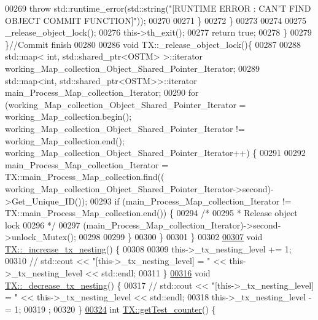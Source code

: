 \begin{DoxyCode}
00269                     \textcolor{keywordflow}{throw} std::runtime\_error(std::string(\textcolor{stringliteral}{"[RUNTIME ERROR : CAN'T FIND OBJECT COMMIT
       FUNCTION]"}));
00270 
00271                 \}
00272         \}
00273 
00274 
00275         \_release\_object\_lock();
00276         this->th\_exit();
00277         \textcolor{keywordflow}{return} \textcolor{keyword}{true};
00278     \}
00279 \}\textcolor{comment}{//Commit finish}
00280 
00286 \textcolor{keywordtype}{void} TX::\_release\_object\_lock()\{
00287     
00288     std::map< int, std::shared\_ptr<OSTM> >::iterator working\_Map\_collection\_Object\_Shared\_Pointer\_Iterator;
00289     std::map<int, std::shared\_ptr<OSTM>>::iterator main\_Process\_Map\_collection\_Iterator;
00290     \textcolor{keywordflow}{for} (working\_Map\_collection\_Object\_Shared\_Pointer\_Iterator = working\_Map\_collection.begin(); 
      working\_Map\_collection\_Object\_Shared\_Pointer\_Iterator != working\_Map\_collection.end(); 
      working\_Map\_collection\_Object\_Shared\_Pointer\_Iterator++) \{
00291 
00292             main\_Process\_Map\_collection\_Iterator = TX::main\_Process\_Map\_collection.find((
      working\_Map\_collection\_Object\_Shared\_Pointer\_Iterator->second)->Get\_Unique\_ID());
00293             \textcolor{keywordflow}{if} (main\_Process\_Map\_collection\_Iterator != TX::main\_Process\_Map\_collection.end()) \{
00294                 \textcolor{comment}{/*}
00295 \textcolor{comment}{                 * Release object lock}
00296 \textcolor{comment}{                 */}
00297                 (main\_Process\_Map\_collection\_Iterator)->second->unlock\_Mutex();
00298                 
00299             \} 
00300         \}
00301 \}
00302 
\hypertarget{_t_x_8cpp_source.tex_l00307}{}\hyperlink{class_t_x_a1384bdf12d795854b5d32e7f61ffbdb8}{00307} \textcolor{keywordtype}{void} \hyperlink{class_t_x_a1384bdf12d795854b5d32e7f61ffbdb8}{TX::\_increase\_tx\_nesting}() \{
00308       
00309     this->\_tx\_nesting\_level += 1;
00310     \textcolor{comment}{// std::cout << "[this->\_tx\_nesting\_level] = " << this->\_tx\_nesting\_level << std::endl;}
00311 \}
\hypertarget{_t_x_8cpp_source.tex_l00316}{}\hyperlink{class_t_x_aa3ac499f576326588628ade96b27b4b1}{00316} \textcolor{keywordtype}{void} \hyperlink{class_t_x_aa3ac499f576326588628ade96b27b4b1}{TX::\_decrease\_tx\_nesting}() \{
00317    \textcolor{comment}{// std::cout << "[this->\_tx\_nesting\_level] = " << this->\_tx\_nesting\_level << std::endl;}
00318     this->\_tx\_nesting\_level -= 1;
00319 ;
00320 \}
\hypertarget{_t_x_8cpp_source.tex_l00324}{}\hyperlink{class_t_x_ae9bf97930c4670f59d334b345353a71e}{00324} \textcolor{keywordtype}{int} \hyperlink{class_t_x_ae9bf97930c4670f59d334b345353a71e}{TX::getTest\_counter}() \{

\end{DoxyCode}
